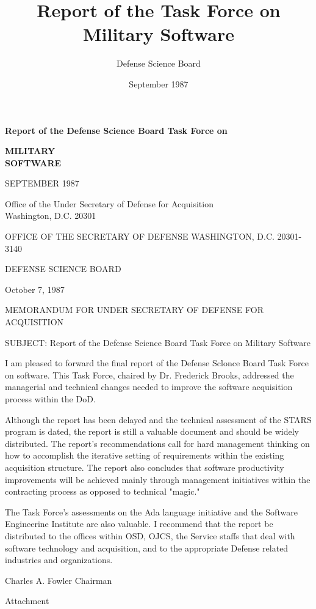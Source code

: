 \documentclass[12pt]{article}
\begin{document}
\title{Report of the Task Force on Military Software}
\author{Defense Science Board}
\date{September 1987}

\textbf{Report of the Defense Science Board Task Force on}

\textbf{MILITARY\\ SOFTWARE}

SEPTEMBER 1987

Office of the Under Secretary of Defense for Acquisition\\
Washington, D.C. 20301

\newpage


OFFICE OF THE SECRETARY OF DEFENSE
WASHINGTON, D.C. 20301-3140

DEFENSE SCIENCE BOARD

October 7, 1987

MEMORANDUM FOR UNDER SECRETARY OF DEFENSE FOR ACQUISITION

SUBJECT: Report of the Defense Science Board Task Force on Military Software

I am pleased to forward the final report of the Defense Sclonce Board Task
Force on software. This Task Force, chaired by Dr. Frederick Brooks, addressed
the managerial and technical changes needed to improve the software
acquisition process within the DoD.

Although the report has been delayed and the technical assessment of the STARS
program is dated, the report is still a valuable document and should be widely
distributed. The report's recommendations call for hard management thinking on
how to accomplish the iterative setting of requirements within the existing
acquisition structure. The report also concludes that software productivity
improvements will be achieved mainly through management initiatives within the
contracting process as opposed to technical "magic."

The Task Force's assessments on the Ada language initiative and the Software
Engineerine Institute are also valuable.  I recommend that the report be
distributed to the offices within OSD, OJCS, the Service staffs that deal with
software technology and acquisition, and to the appropriate Defense related
industries and organizations.

Charles A. Fowler
Chairman

Attachment

\newpage

\end{document}
